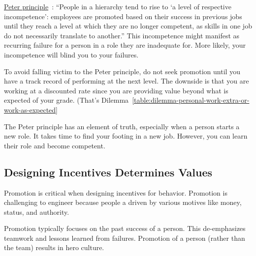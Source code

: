 \href{https://en.wikipedia.org/wiki/Peter_principle}{Peter principle}~\cite{1970_Peter}:
``People in a hierarchy tend to rise to `a level of respective incompetence': employees are promoted based on their success in previous jobs until they reach a level at which they are no longer competent, as skills in one job do not necessarily translate to another.''
This incompetence might manifest as recurring failure for a person in a role they are inadequate for. More likely, your incompetence will blind you to your failures.

To avoid falling victim to the Peter principle, do not seek promotion until you have a track record of performing at the next level. The downside is that you are working at a discounted rate since you are providing value beyond what is expected of your grade. (That's Dilemma~\ref{table:dilemma-personal-work-extra-or-work-as-expected}\iftoggle{haspagenumbers}{ on page~\pageref{table:dilemma-personal-work-extra-or-work-as-expected}.)}{.)} 


The Peter principle has an element of truth, especially when a person starts a new role. It takes time to find your footing in a new job. However, you can learn their role and become competent. %


\subsection*{Designing Incentives Determines Values}
Promotion is critical when designing incentives for behavior. Promotion is challenging to engineer because people a driven by various motives like money, status, and authority. 


Promotion typically focuses on the past success of a person. This de-emphasizes teamwork and lessons learned from failures. 
Promotion of a person (rather than the team) results in hero culture.


